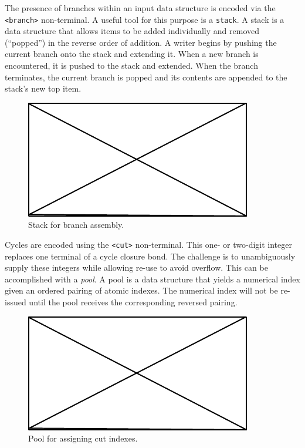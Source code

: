 \documentclass{article}
\def\ttt{\texttt}
\begin{document}
The presence of branches within an input data structure is encoded via the \ttt{<branch>} non-terminal. A useful tool for this purpose is a \ttt{stack}. A stack is a data structure that allows items to be added individually and removed (\enquote{popped}) in the reverse order of addition. A writer begins by pushing the current branch onto the stack and extending it. When a new branch is encountered, it is pushed to the stack and extended. When the branch terminates, the current branch is popped and its contents are appended to the stack's new top item.

\begin{figure}
    \centering
    \includegraphics{filler}
    \caption{Stack for branch assembly.}
    \label{fig:branch-stack}
\end{figure}

Cycles are encoded using the \ttt{<cut>} non-terminal. This one- or two-digit integer replaces one terminal of a cycle closure bond. The challenge is to unambiguously supply these integers while allowing re-use to avoid overflow. This can be accomplished with a \textit{pool}. A pool is a data structure that yields a numerical index given an ordered pairing of atomic indexes. The numerical index will not be re-issued until the pool receives the corresponding reversed pairing.

\begin{figure}
    \centering
    \includegraphics{filler}
    \caption{Pool for assigning cut indexes.}
    \label{fig:pool}
\end{figure}
\end{document}
